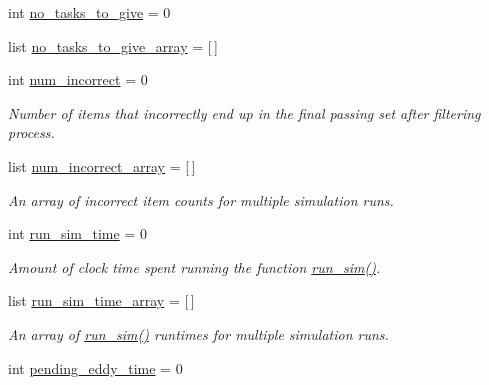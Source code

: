 \begin{DoxyCompactItemize}
int \mbox{\hyperlink{classdynamicfilterapp_1_1test__simulations_1_1_simulation_test_a50859596b592ecea7447a51ab83209d1}{no\+\_\+tasks\+\_\+to\+\_\+give}} = 0
\item 
list \mbox{\hyperlink{classdynamicfilterapp_1_1test__simulations_1_1_simulation_test_aca05845f48ed602774413566dcbed8ee}{no\+\_\+tasks\+\_\+to\+\_\+give\+\_\+array}} = \mbox{[}$\,$\mbox{]}
\item 
int \mbox{\hyperlink{classdynamicfilterapp_1_1test__simulations_1_1_simulation_test_ac8f769f7a743d3c6bb9e29cdc01a67b1}{num\+\_\+incorrect}} = 0
\begin{DoxyCompactList}\small\item\em Number of items that incorrectly end up in the final passing set after filtering process. \end{DoxyCompactList}\item 
list \mbox{\hyperlink{classdynamicfilterapp_1_1test__simulations_1_1_simulation_test_ae04fa3a990d11de4cda2e4d61a4d4756}{num\+\_\+incorrect\+\_\+array}} = \mbox{[}$\,$\mbox{]}
\begin{DoxyCompactList}\small\item\em An array of incorrect item counts for multiple simulation runs. \end{DoxyCompactList}\item 
int \mbox{\hyperlink{classdynamicfilterapp_1_1test__simulations_1_1_simulation_test_a3ef3670fbfd221b5d98a34fceba93c19}{run\+\_\+sim\+\_\+time}} = 0
\begin{DoxyCompactList}\small\item\em Amount of clock time spent running the function \mbox{\hyperlink{classdynamicfilterapp_1_1test__simulations_1_1_simulation_test_a7c1fa7ae63b7dde48b4c91c2eeda3b75}{run\+\_\+sim()}}. \end{DoxyCompactList}\item 
list \mbox{\hyperlink{classdynamicfilterapp_1_1test__simulations_1_1_simulation_test_a26bec4b04005dffaddd57bdcd42249f3}{run\+\_\+sim\+\_\+time\+\_\+array}} = \mbox{[}$\,$\mbox{]}
\begin{DoxyCompactList}\small\item\em An array of \mbox{\hyperlink{classdynamicfilterapp_1_1test__simulations_1_1_simulation_test_a7c1fa7ae63b7dde48b4c91c2eeda3b75}{run\+\_\+sim()}} runtimes for multiple simulation runs. \end{DoxyCompactList}\item 
int \mbox{\hyperlink{classdynamicfilterapp_1_1test__simulations_1_1_simulation_test_a059ceb58f40a64c850d6a7e78752145b}{pending\+\_\+eddy\+\_\+time}} = 0

\end{DoxyCompactItemize}
